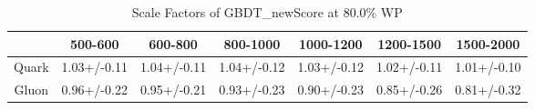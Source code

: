 \begin{table}
\centering
\caption{Scale Factors of GBDT_newScore at 80.0\% WP}
\label{tab:GBDT_newScore_0.8_Gluon}
\begin{tabular}{ccccccc}
\toprule
{} &      500-600 &      600-800 &     800-1000 &    1000-1200 &    1200-1500 &    1500-2000 \\
\midrule
Quark &  1.03+/-0.11 &  1.04+/-0.11 &  1.04+/-0.12 &  1.03+/-0.12 &  1.02+/-0.11 &  1.01+/-0.10 \\
Gluon &  0.96+/-0.22 &  0.95+/-0.21 &  0.93+/-0.23 &  0.90+/-0.23 &  0.85+/-0.26 &  0.81+/-0.32 \\
\bottomrule
\end{tabular}
\end{table}
